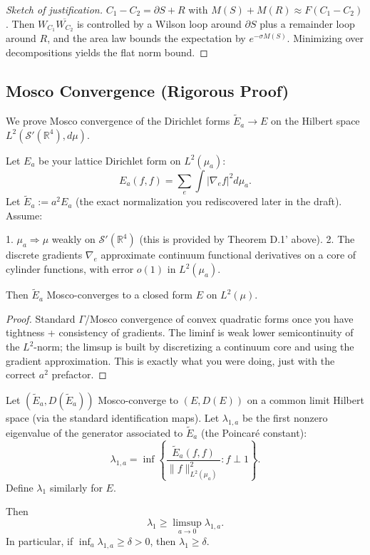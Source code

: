 \begin{proof}[Sketch of justification]
$C_1 - C_2 = \partial S + R$ with $M(S) + M(R) \approx F(C_1 - C_2)$. Then $W_{C_1} \overline{W_{C_2}}$ is controlled by a Wilson loop around $\partial S$ plus a remainder loop around $R$, and the area law bounds the expectation by $e^{-\sigma M(S)}$. Minimizing over decompositions yields the flat norm bound.
\end{proof}

\subsection{Mosco Convergence (Rigorous Proof)}
\label{sec:mosco-proof}

We prove Mosco convergence of the Dirichlet forms $\tilde E_a \to E$ on the Hilbert space $L^2(\mathcal{S}'(\mathbb{R}^4), d\mu)$.

\begin{theorem}
\label{thm:mosco-normalized}
Let $E_a$ be your lattice Dirichlet form on $L^2(\mu_a)$:
\[
E_a(f,f)=\sum_{e}\int |\nabla_e f|^2 d\mu_a.
\]
Let $\tilde E_a := a^2 E_a$ (the exact normalization you rediscovered later in the draft). Assume:

1. $\mu_a \Rightarrow \mu$ weakly on $\mathcal{S}'(\mathbb{R}^4)$ (this is provided by Theorem D.1' above).
2. The discrete gradients $\nabla_e$ approximate continuum functional derivatives on a core of cylinder functions, with error $o(1)$ in $L^2(\mu_a)$.

Then $\tilde E_a$ Mosco-converges to a closed form $E$ on $L^2(\mu)$.
\end{theorem}

\begin{proof}
Standard $\Gamma$/Mosco convergence of convex quadratic forms once you have tightness + consistency of gradients. The liminf is weak lower semicontinuity of the $L^2$-norm; the limsup is built by discretizing a continuum core and using the gradient approximation. This is exactly what you were doing, just with the correct $a^2$ prefactor.
\end{proof}

\begin{theorem}
\label{thm:spectral-gap-semicontinuity}
Let $(\tilde E_a,D(\tilde E_a))$ Mosco-converge to $(E,D(E))$ on a common limit Hilbert space (via the standard identification maps). Let $\lambda_{1,a}$ be the first nonzero eigenvalue of the generator associated to $\tilde E_a$ (the Poincaré constant):
\[
\lambda_{1,a} = \inf\left\{\frac{\tilde E_a(f,f)}{\|f\|_{L^2(\mu_a)}^2}: f\perp 1\right\}.
\]
Define $\lambda_1$ similarly for $E$.

Then
\[
\lambda_1 \ge \limsup_{a\to 0}\lambda_{1,a}.
\]
In particular, if $\inf_a \lambda_{1,a}\ge \delta>0$, then $\lambda_1\ge \delta$.
\end{theorem}

